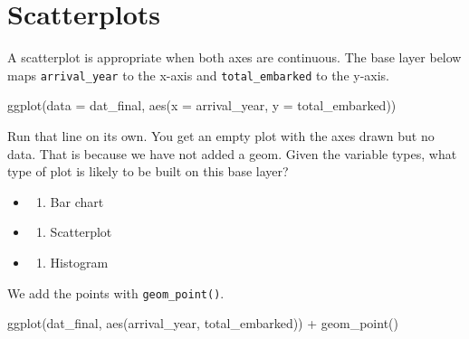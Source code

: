 \documentclass[
  english,
  letterpaper,
]{book}
\newenvironment{Shaded}{\begin{snugshade}}{\end{snugshade}}
\newcommand{\AttributeTok}[1]{\textcolor[rgb]{0.40,0.45,0.13}{#1}}
\newcommand{\FunctionTok}[1]{\textcolor[rgb]{0.28,0.35,0.67}{#1}}
\newcommand{\NormalTok}[1]{\textcolor[rgb]{0.00,0.23,0.31}{#1}}
\newcommand{\SpecialCharTok}[1]{\textcolor[rgb]{0.37,0.37,0.37}{#1}}
\providecommand{\tightlist}{%
  \setlength{\itemsep}{0pt}\setlength{\parskip}{0pt}}
\begin{document}
\section{Scatterplots}\label{scatterplots}

A scatterplot is appropriate when both axes are continuous. The base
layer below maps \texttt{arrival\_year} to the x-axis and
\texttt{total\_embarked} to the y-axis.

\begin{Shaded}
\begin{Highlighting}[]
\FunctionTok{ggplot}\NormalTok{(}\AttributeTok{data =}\NormalTok{ dat\_final, }\FunctionTok{aes}\NormalTok{(}\AttributeTok{x =}\NormalTok{ arrival\_year, }\AttributeTok{y =}\NormalTok{ total\_embarked))}
\end{Highlighting}
\end{Shaded}

Run that line on its own. You get an empty plot with the axes drawn but
no data. That is because we have not added a geom. Given the variable
types, what type of plot is likely to be built on this base layer?

\begin{itemize}
\tightlist
\item
  \begin{enumerate}
  \def\labelenumi{(\Alph{enumi})}
  \tightlist
  \item
    Bar chart\\
  \end{enumerate}
\item
  \begin{enumerate}
  \def\labelenumi{(\Alph{enumi})}
  \setcounter{enumi}{1}
  \tightlist
  \item
    Scatterplot\\
  \end{enumerate}
\item
  \begin{enumerate}
  \def\labelenumi{(\Alph{enumi})}
  \setcounter{enumi}{2}
  \tightlist
  \item
    Histogram
  \end{enumerate}
\end{itemize}

We add the points with \texttt{geom\_point()}.

\begin{Shaded}
\begin{Highlighting}[]
\FunctionTok{ggplot}\NormalTok{(dat\_final, }\FunctionTok{aes}\NormalTok{(arrival\_year, total\_embarked)) }\SpecialCharTok{+}
  \FunctionTok{geom\_point}\NormalTok{()}
\end{Highlighting}
\end{Shaded}
\end{document}

